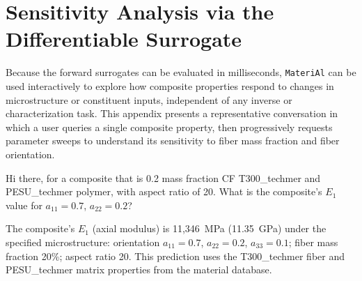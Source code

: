 \documentclass[preprint,review,10pt,number]{elsarticle}
\begin{document}
\FloatBarrier
\section{Sensitivity Analysis via the Differentiable Surrogate}
\label{app:sensitivity_demo}

Because the forward surrogates can be evaluated in milliseconds, \texttt{MateriAl} can be used interactively to explore how composite properties respond to changes in microstructure or constituent inputs, independent of any inverse or characterization task. This appendix presents a representative conversation in which a user queries a single composite property, then progressively requests parameter sweeps to understand its sensitivity to fiber mass fraction and fiber orientation.

\begin{center}
\begin{tcolorbox}[
    breakable,
    colback=gray!5,
    colframe=black,
    boxrule=0.6pt,
    arc=2pt,
    left=8pt, right=8pt, top=6pt, bottom=6pt,
    title={\textbf{Sensitivity Exploration} \hfill \textit{Interactive parameter sweeps}},
    fonttitle=\small
]

\begin{tcolorbox}[
    breakable,
    colback=gray!8, colframe=gray!60, boxrule=0.5pt, arc=2pt,
    left=6pt, right=6pt, top=4pt, bottom=4pt,
    title={\textbf{User}}, fonttitle=\small\bfseries, coltitle=black
]
\small
Hi there, for a composite that is 0.2 mass fraction CF T300\_techmer and PESU\_techmer polymer, with aspect ratio of 20. What is the composite's $E_1$ value for $a_{11}=0.7$, $a_{22}=0.2$?
\end{tcolorbox}
\vspace{4pt}
\begin{tcolorbox}[
    breakable,
    colback=gray!3, colframe=gray!40, boxrule=0.5pt, arc=2pt,
    left=6pt, right=6pt, top=4pt, bottom=4pt,
    title={\textbf{\texttt{MateriAl}}}, fonttitle=\small\bfseries, coltitle=black
]
\small
The composite's $E_1$ (axial modulus) is 11,346~MPa (11.35~GPa) under the specified microstructure: orientation $a_{11}=0.7$, $a_{22}=0.2$, $a_{33}=0.1$; fiber mass fraction 20\%; aspect ratio 20. This prediction uses the T300\_techmer fiber and PESU\_techmer matrix properties from the material database.
\end{tcolorbox}


\end{tcolorbox}
\end{center}
\end{document}
